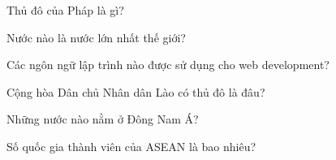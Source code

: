 \documentclass{article}
\begin{document}
\begin{question}
Thủ đô của Pháp là gì?
\end{question}

\begin{question}
Nước nào là nước lớn nhất thế giới?
\end{question}

\begin{questionmult}
Các ngôn ngữ lập trình nào được sử dụng cho web development?
\end{questionmult}

\begin{question}
Cộng hòa Dân chủ Nhân dân Lào có thủ đô là đâu?
\end{question}

\begin{questionmult}
Những nước nào nằm ở Đông Nam Á?
\end{questionmult}

\begin{question}
Số quốc gia thành viên của ASEAN là bao nhiêu?
\end{question}
\end{document}
